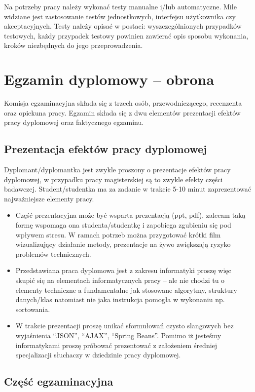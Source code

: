 \documentclass[12pt,a4paper]{article}
\begin{document}
Na potrzeby pracy należy wykonać testy manualne i/lub automatyczne. Mile widziane jest zastosowanie testów jednostkowych, interfejsu użytkownika czy akceptacyjnych. Testy należy opisać w postaci: wyszczególnionych przypadków testowych, każdy przypadek testowy powinien zawierać opis sposobu wykonania, kroków niezbędnych do jego przeprowadzenia.


\section{Egzamin dyplomowy -- obrona}

Komisja egzaminacyjna składa się z trzech osób, przewodniczącego, recenzenta oraz opiekuna pracy. Egzamin składa się z dwu elementów prezentacji efektów pracy dyplomowej oraz faktycznego egzaminu.

\subsection{Prezentacja efektów pracy dyplomowej}
Dyplomant/dyplomantka jest zwykle proszony o prezentacje efektów pracy dyplomowej, w przypadku pracy magisterskiej są to zwykle efekty części badawczej. Student/studentka ma za zadanie w trakcie 5-10 minut zaprezentować najważniejsze elementy pracy.

\begin{itemize}
\item Część prezentacyjna może być wsparta prezentacją (ppt, pdf), zalecam taką formę wspomaga ona studenta/studentkę i zapobiega zgubieniu się pod wpływem stresu. W ramach potrzeb można przygotować krótki film wizualizujący działanie metody, prezentacje na żywo zwiększają ryzyko problemów technicznych.

\item Przedstawiana praca dyplomowa jest z zakresu informatyki proszę więc skupić się na elementach informatycznych pracy -- ale nie chodzi tu o elementy techniczne a fundamentalne jak stosowane algorytmy, struktury danych/klas natomiast nie jaka instrukcja pomogła w wykonaniu np. sortowania.

\item W trakcie prezentacji proszę unikać sformułowań czysto slangowych bez wyjaśnienia ``JSON'', ``AJAX'', ``Spring Beans''. Pomimo iż jesteśmy informatykami proszę próbować prezentować z założeniem średniej specjalizacji słuchaczy w dziedzinie pracy dyplomowej.
\end{itemize}

\subsection{Część egzaminacyjna}
\end{document}
